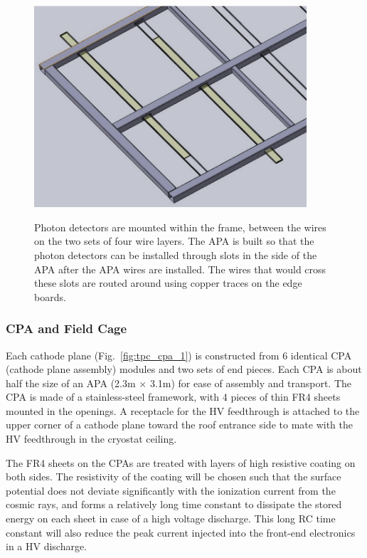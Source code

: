 \begin{figure}[t]
  \centering
\includegraphics[width=4in]{figures/TPC_APA_3}
\label{fig:pd_insertion}
  \caption{Photon detectors are mounted within the frame, between the wires on the two sets of four wire layers.  The APA is built so that the photon detectors can be installed through slots in the side of the APA after the APA wires are installed.  The wires that would cross these slots are routed around using copper traces on the edge boards.}
\end{figure}


\subsubsection{CPA and Field Cage}



Each cathode plane (Fig.~\ref{fig:tpc_cpa_1}) is constructed from 6 identical CPA (cathode plane assembly) modules and two sets of end pieces. Each CPA is about half the size of an APA  (2.3m $\times$ 3.1m) for ease of assembly and transport.  The CPA is made of a stainless-steel framework, 
with 4 pieces of thin FR4 sheets mounted in the openings.  A receptacle for the HV feedthrough is attached to the upper corner of a cathode plane toward the roof entrance side to mate with the HV feedthrough in the cryostat ceiling. 

The FR4 sheets on the CPAs are treated with layers of high resistive coating on both sides.  The resistivity of the coating will be chosen such that the surface potential does not deviate significantly with the ionization current from the cosmic rays, and forms a relatively long time constant to dissipate the stored energy on each sheet in case of a high voltage discharge.  This long RC time constant will also reduce the peak current injected into the front-end electronics in a HV discharge.

